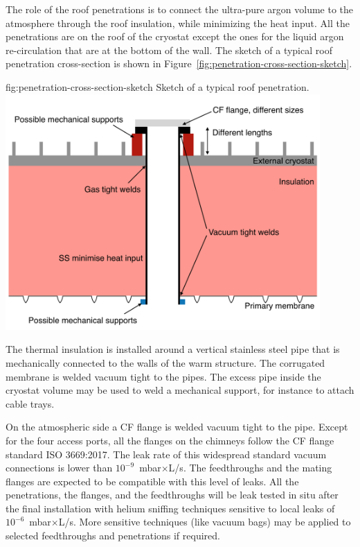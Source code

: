 The role of the roof penetrations is to connect the ultra-pure argon volume to the atmosphere through the roof insulation, while minimizing the heat input.
All the penetrations are on the roof of the cryostat except the ones for the liquid argon re-circulation that are at the bottom of the  wall.
The sketch of a typical roof penetration cross-section is shown in Figure~\ref{fig:penetration-cross-section-sketch}.
\begin{dunefigure}{fig:penetration-cross-section-sketch}
{Sketch of a typical roof penetration.}
\includegraphics[width=0.9\textwidth]{graphics/penetration-cross-section-sketch.png}
\end{dunefigure}
The thermal insulation is installed around a vertical stainless steel pipe that is mechanically connected to the walls of the warm structure.
The corrugated membrane is welded vacuum tight to the pipes.
The excess pipe inside the cryostat volume may be used to weld a mechanical support, for instance to attach cable trays.

On the atmospheric side a  CF flange is welded vacuum tight to the pipe.
Except for the four access ports, all the flanges on the chimneys follow the  CF flange standard ISO 3669:2017.
The leak rate of this widespread standard vacuum connections is lower than $10^{-9}$~mbar$\times$L/s.
The feedthroughs and the mating flanges are expected to be compatible with this level of leaks.
All the penetrations, the flanges, and the feedthroughs will be leak tested in situ after the final installation with helium sniffing techniques sensitive to local leaks of $10^{-6}$~mbar$\times$L/s.
More sensitive techniques (like vacuum bags) may be applied to selected feedthroughs and penetrations if required.

